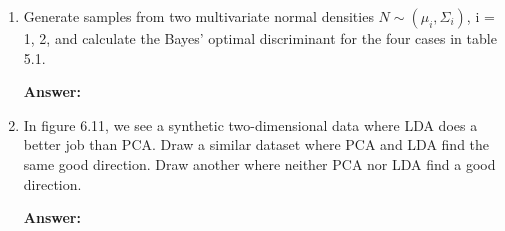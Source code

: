 \documentclass{article}
\begin{document}
\begin{enumerate}
    \item  Generate samples from two multivariate normal densities $N\sim(\mu_i, \Sigma_i)$, i = 1, 2, and calculate the Bayes’ optimal discriminant for the four cases in table 5.1. %
    
    \textbf{Answer:} \\

    \item  In figure 6.11, we see a synthetic two-dimensional data where LDA does a better job than PCA. Draw a similar dataset where PCA and LDA find the same good direction. Draw another where neither PCA nor LDA find a good direction. %
    
    \textbf{Answer:} \\


\end{enumerate}
\end{document}
